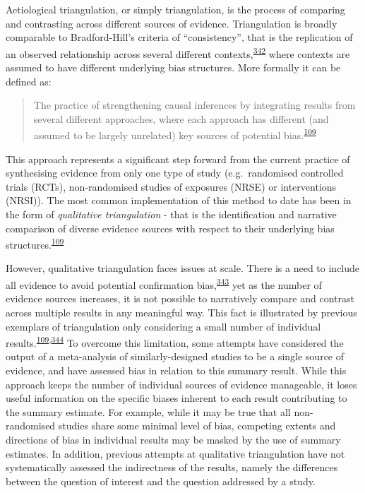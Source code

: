 \documentclass[a4paper, twoside]{templates/ociamthesis}
\begin{document}
Aetiological triangulation, or simply triangulation, is the process of comparing and contrasting across different sources of evidence. Triangulation is broadly comparable to Bradford-Hill's criteria of ``consistency'', that is the replication of an observed relationship across several different contexts,\textsuperscript{\protect\hyperlink{ref-hill1965}{342}} where contexts are assumed to have different underlying bias structures. More formally it can be defined as:

\begin{quote}
The practice of strengthening causal inferences by integrating results from several different approaches, where each approach has different (and assumed to be largely unrelated) key sources of potential bias.\textsuperscript{\protect\hyperlink{ref-lawlor2016}{109}}
\end{quote}

This approach represents a significant step forward from the current practice of synthesising evidence from only one type of study (e.g.~randomised controlled trials (RCTs), non-randomised studies of exposures (NRSE) or interventions (NRSI)). The most common implementation of this method to date has been in the form of \emph{qualitative triangulation} - that is the identification and narrative comparison of diverse evidence sources with respect to their underlying bias structures.\textsuperscript{\protect\hyperlink{ref-lawlor2016}{109}}

However, qualitative triangulation faces issues at scale. There is a need to include all evidence to avoid potential confirmation bias,\textsuperscript{\protect\hyperlink{ref-dubroff2018}{343}} yet as the number of evidence sources increases, it is not possible to narratively compare and contrast across multiple results in any meaningful way. This fact is illustrated by previous exemplars of triangulation only considering a small number of individual results.\textsuperscript{\protect\hyperlink{ref-lawlor2016}{109},\protect\hyperlink{ref-ference2014}{344}} To overcome this limitation, some attempts have considered the output of a meta-analysis of similarly-designed studies to be a single source of evidence, and have assessed bias in relation to this summary result. While this approach keeps the number of individual sources of evidence manageable, it loses useful information on the specific biases inherent to each result contributing to the summary estimate. For example, while it may be true that all non-randomised studies share some minimal level of bias, competing extents and directions of bias in individual results may be masked by the use of summary estimates. In addition, previous attempts at qualitative triangulation have not systematically assessed the indirectness of the results, namely the differences between the question of interest and the question addressed by a study.
\end{document}
